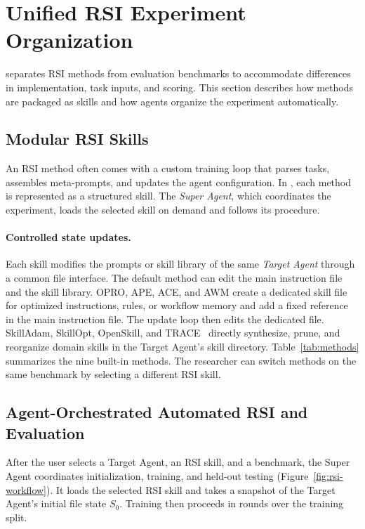 \section{Unified RSI Experiment Organization}
\label{sec:organization}

\fwname separates RSI methods from evaluation benchmarks to accommodate differences in implementation, task inputs, and scoring. This section describes how methods are packaged as skills and how agents organize the experiment automatically.



\subsection{Modular RSI Skills}

An RSI method often comes with a custom training loop that parses tasks, assembles meta-prompts, and updates the agent configuration. In \fwname, each method is represented as a structured skill. The \emph{Super Agent}, which coordinates the experiment, loads the selected skill on demand and follows its procedure.

\paragraph{Controlled state updates.}
Each skill modifies the prompts or skill library of the same \emph{Target Agent} through a common file interface. The default method can edit the main instruction file and the skill library. OPRO, APE, ACE, and AWM create a dedicated skill file for optimized instructions, rules, or workflow memory and add a fixed reference in the main instruction file. The update loop then edits the dedicated file. SkillAdam, SkillOpt, OpenSkill, and TRACE~\citep{wu2026trace} directly synthesize, prune, and reorganize domain skills in the Target Agent's skill directory. Table~\ref{tab:methods} summarizes the nine built-in methods. The researcher can switch methods on the same benchmark by selecting a different RSI skill.

\subsection{Agent-Orchestrated Automated RSI and Evaluation}
\label{sec:orchestration}

After the user selects a Target Agent, an RSI skill, and a benchmark, the Super Agent coordinates initialization, training, and held-out testing (Figure~\ref{fig:rsi-workflow}). It loads the selected RSI skill and takes a snapshot of the Target Agent's initial file state \(S_0\). Training then proceeds in rounds over the training split.

